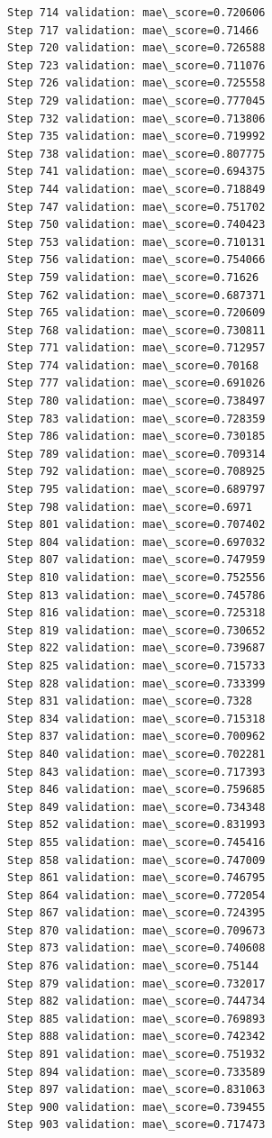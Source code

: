 \documentclass[11pt]{article}
\begin{document}
\begin{Verbatim}[commandchars=\\\{\}]
Step 714 validation: mae\_score=0.720606
Step 717 validation: mae\_score=0.71466
Step 720 validation: mae\_score=0.726588
Step 723 validation: mae\_score=0.711076
Step 726 validation: mae\_score=0.725558
Step 729 validation: mae\_score=0.777045
Step 732 validation: mae\_score=0.713806
Step 735 validation: mae\_score=0.719992
Step 738 validation: mae\_score=0.807775
Step 741 validation: mae\_score=0.694375
Step 744 validation: mae\_score=0.718849
Step 747 validation: mae\_score=0.751702
Step 750 validation: mae\_score=0.740423
Step 753 validation: mae\_score=0.710131
Step 756 validation: mae\_score=0.754066
Step 759 validation: mae\_score=0.71626
Step 762 validation: mae\_score=0.687371
Step 765 validation: mae\_score=0.720609
Step 768 validation: mae\_score=0.730811
Step 771 validation: mae\_score=0.712957
Step 774 validation: mae\_score=0.70168
Step 777 validation: mae\_score=0.691026
Step 780 validation: mae\_score=0.738497
Step 783 validation: mae\_score=0.728359
Step 786 validation: mae\_score=0.730185
Step 789 validation: mae\_score=0.709314
Step 792 validation: mae\_score=0.708925
Step 795 validation: mae\_score=0.689797
Step 798 validation: mae\_score=0.6971
Step 801 validation: mae\_score=0.707402
Step 804 validation: mae\_score=0.697032
Step 807 validation: mae\_score=0.747959
Step 810 validation: mae\_score=0.752556
Step 813 validation: mae\_score=0.745786
Step 816 validation: mae\_score=0.725318
Step 819 validation: mae\_score=0.730652
Step 822 validation: mae\_score=0.739687
Step 825 validation: mae\_score=0.715733
Step 828 validation: mae\_score=0.733399
Step 831 validation: mae\_score=0.7328
Step 834 validation: mae\_score=0.715318
Step 837 validation: mae\_score=0.700962
Step 840 validation: mae\_score=0.702281
Step 843 validation: mae\_score=0.717393
Step 846 validation: mae\_score=0.759685
Step 849 validation: mae\_score=0.734348
Step 852 validation: mae\_score=0.831993
Step 855 validation: mae\_score=0.745416
Step 858 validation: mae\_score=0.747009
Step 861 validation: mae\_score=0.746795
Step 864 validation: mae\_score=0.772054
Step 867 validation: mae\_score=0.724395
Step 870 validation: mae\_score=0.709673
Step 873 validation: mae\_score=0.740608
Step 876 validation: mae\_score=0.75144
Step 879 validation: mae\_score=0.732017
Step 882 validation: mae\_score=0.744734
Step 885 validation: mae\_score=0.769893
Step 888 validation: mae\_score=0.742342
Step 891 validation: mae\_score=0.751932
Step 894 validation: mae\_score=0.733589
Step 897 validation: mae\_score=0.831063
Step 900 validation: mae\_score=0.739455
Step 903 validation: mae\_score=0.717473

\end{Verbatim}
\end{document}
